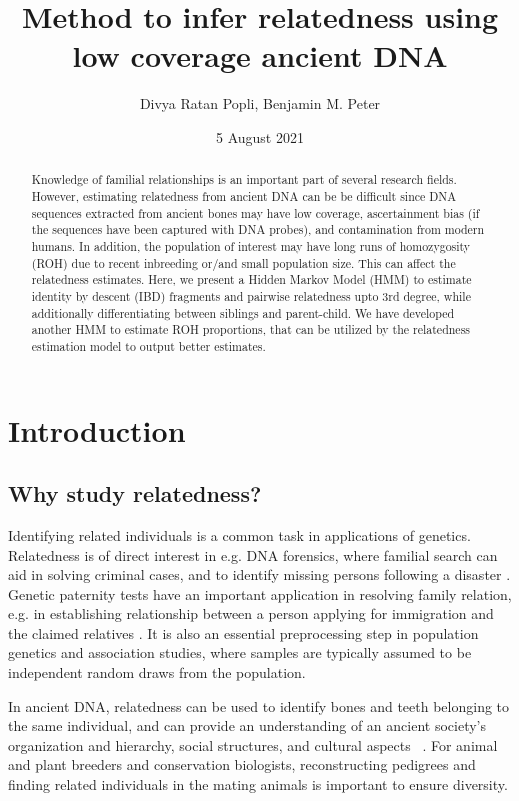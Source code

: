 \documentclass[12pt, letterpaper]{article}
\title{Method to infer relatedness using low coverage ancient DNA}
\author{Divya Ratan Popli, Benjamin M. Peter}
\date{5 August 2021}
\begin{document}
\maketitle

\begin{abstract}
\noindent Knowledge of familial relationships is an important part of several research fields. However, estimating relatedness from ancient DNA can be be difficult since DNA sequences extracted from ancient bones may have low coverage, ascertainment bias (if the sequences have been captured with DNA probes), and contamination from modern humans. In addition, the population of interest may have long runs of homozygosity (ROH) due to recent inbreeding or/and small population size. This can affect the relatedness estimates. Here, we present a Hidden Markov Model (HMM) to estimate identity by descent (IBD) fragments and pairwise relatedness upto 3rd degree, while additionally differentiating between siblings and parent-child. We have developed another HMM to estimate ROH proportions, that can be utilized by the relatedness estimation model to output better estimates. 
\end{abstract}

\section{Introduction}

\subsection{Why study relatedness?}
Identifying related individuals is a common task in applications of genetics. Relatedness is of direct interest in e.g. DNA forensics, where familial search can aid in solving criminal cases, and to identify missing persons following a disaster \cite{murphy_law_2018,ram_genealogy_2018}. Genetic paternity tests have an important application in resolving family relation, e.g. in establishing relationship between a person applying for immigration and the claimed relatives \cite{egeland_beyond_2000}. It is also an essential preprocessing step in population genetics and association studies, where samples are typically assumed to be independent random draws from the population.

In ancient DNA, relatedness can be used to identify bones and teeth belonging to the same individual, and can provide an  understanding of an ancient society's organization and hierarchy, social structures, and cultural aspects ~\cite{baca_ancient_2012,mittnik_kinship-based_2019,sikora_ancient_2017}. For animal and plant breeders and conservation biologists, reconstructing pedigrees and finding related individuals in the mating animals is important to ensure diversity. ~\cite{habier_impact_2007,oliehoek_estimating_2006,kardos_measuring_2015} 
\end{document}
